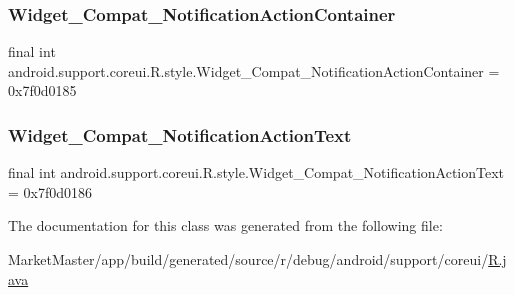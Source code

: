\subsubsection{\texorpdfstring{Widget\+\_\+\+Compat\+\_\+\+Notification\+Action\+Container}{Widget\_Compat\_NotificationActionContainer}}
{\footnotesize\ttfamily final int android.\+support.\+coreui.\+R.\+style.\+Widget\+\_\+\+Compat\+\_\+\+Notification\+Action\+Container = 0x7f0d0185\hspace{0.3cm}{\ttfamily [static]}}

\mbox{\label{classandroid_1_1support_1_1coreui_1_1R_1_1style_a5b59f4ac1e5a41d79c19894c963d7f7a}} 
\subsubsection{\texorpdfstring{Widget\+\_\+\+Compat\+\_\+\+Notification\+Action\+Text}{Widget\_Compat\_NotificationActionText}}
{\footnotesize\ttfamily final int android.\+support.\+coreui.\+R.\+style.\+Widget\+\_\+\+Compat\+\_\+\+Notification\+Action\+Text = 0x7f0d0186\hspace{0.3cm}{\ttfamily [static]}}



The documentation for this class was generated from the following file\+:\begin{DoxyCompactItemize}
\item 
Market\+Master/app/build/generated/source/r/debug/android/support/coreui/\mbox{\hyperlink{debug_2android_2support_2coreui_2R_8java}{R.\+java}}\end{DoxyCompactItemize}
